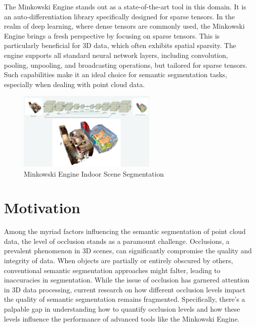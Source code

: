 \documentclass[11pt, a4paper,oneside,chapterprefix=false]{scrbook}
\begin{document}
The Minkowski Engine stands out as a state-of-the-art tool in this domain. It is an auto-differentiation library specifically designed for sparse tensors. In the realm of deep learning, where dense tensors are commonly used, the Minkowski Engine brings a fresh perspective by focusing on sparse tensors. This is particularly beneficial for 3D data, which often exhibits spatial sparsity. The engine supports all standard neural network layers, including convolution, pooling, unpooling, and broadcasting operations, but tailored for sparse tensors. Such capabilities make it an ideal choice for semantic segmentation tasks, especially when dealing with point cloud data.

\begin{figure}[h]
    \centering
    \includegraphics*[width=0.6\textwidth]{figures/Minkowski Engine.png}
    \caption{Minkowski Engine Indoor Scene Segmentation}
    \label{fig:minkowski}
\end{figure}



\section{Motivation} \label{sec:motivation}

Among the myriad factors influencing the semantic segmentation of point cloud data, the level of occlusion stands as a paramount challenge. Occlusions, a prevalent phenomenon in 3D scenes, can significantly compromise the quality and integrity of data. When objects are partially or entirely obscured by others, conventional semantic segmentation approaches might falter, leading to inaccuracies in segmentation. While the issue of occlusion has garnered attention in 3D data processing, current research on how different occlusion levels impact the quality of semantic segmentation remains fragmented. Specifically, there's a palpable gap in understanding how to quantify occlusion levels and how these levels influence the performance of advanced tools like the Minkowski Engine. 
\end{document}
